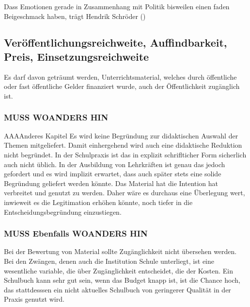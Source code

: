 Dass Emotionen gerade in Zusammenhang mit Politik bisweilen einen faden Beigeschmack haben, trägt Hendrik Schröder (\citeyear[4-5]{Schroder.2020}) 



\subsection{Veröffentlichungsreichweite, Auffindbarkeit, Preis, Einsetzungsreichweite \label{öffi}}

Es darf davon geträumt werden, Unterrichtsmaterial, welches durch öffentliche oder fast öffentliche Gelder finanziert wurde, auch der Öffentlichkeit zugänglich ist.



\subsubsection{MUSS WOANDERS HIN}
AAAAnderes Kapitel
Es wird keine Begründung zur didaktischen Auswahl der Themen mitgeliefert. Damit einhergehend wird auch eine didaktische Reduktion nicht begründet. In der Schulpraxis ist das in explizit schriflticher Form sicherlich auch nicht üblich. In der Ausbildung von Lehrkräften ist genau das jedoch gefordert und es wird implizit erwartet, dass auch später stets eine solide Begründung geliefert werden könnte.
Das Material hat die Intention hat verbreitet und genutzt zu werden. Daher wäre es durchaus eine Überlegung wert, inwieweit es die Legitimation  erhöhen könnte, noch tiefer in die Entscheidungsbegründung einzustiegen.

\subsubsection{MUSS Ebenfalls WOANDERS HIN}
Bei der Bewertung von Material sollte Zugänglichkeit nicht übersehen werden. Bei den Zwängen, denen auch die Institution Schule unterliegt, ist eine wesentliche variable, die über Zugänglichkeit entscheidet, die der Kosten. 
Ein Schulbuch kann sehr gut sein, wenn das Budget knapp ist, ist die Chance hoch, das stattdesssen ein nicht aktuelles Schulbuch von geringerer Qualität in der Praxis genutzt wird. 


